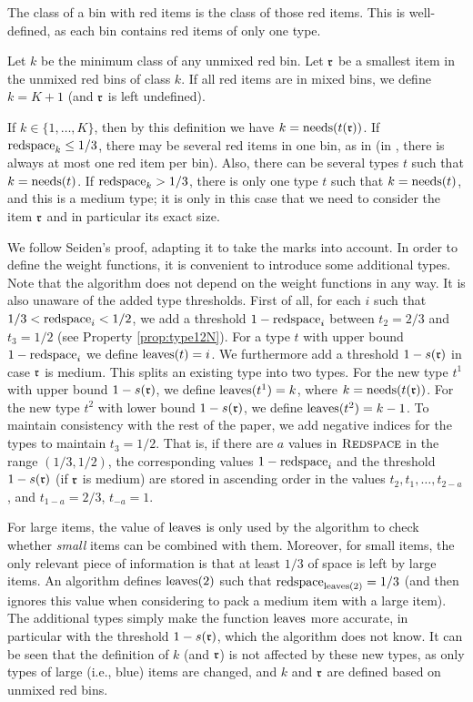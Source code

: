 The class of a bin with red items is the class of those red items.
This is well-defined, as each bin contains red items of only one type.

\begin{definition}
	\label{def:6}
	Let $k$ be the minimum class of any unmixed red bin.
Let $\mathfrak{r}$ be a smallest item in the unmixed red bins of class $k$. If all red items are in mixed bins, we define $k=K+1$ (and $\mathfrak{r}$ is left undefined).
\end{definition}

If $k\in\{1,\dots,K\}$, then by this definition we have $k=\mathrm{needs}(t(\mathfrak{r}))$. 
If $\mathrm{redspace}_k\le 1/3$, there may be several red items in one bin,
as in {\SuperH} (in {\Hpp}, there is always at most one red item per bin).
Also, there can be several types $t$ such that $k=\mathrm{needs}(t)$.
If $\mathrm{redspace}_k > 1/3$, there is only one type $t$ such that $k=\mathrm{needs}(t)$, and this is a medium type; it is only in this case that we need to consider the item $\mathfrak{r}$ and in particular its exact size.

We follow Seiden's proof, adapting it to take the marks into account.
In order to define the weight functions, it is convenient to introduce some additional types.
Note that the algorithm does not depend on the weight functions in any way.
It is also unaware of the added type thresholds.
First of all, for each $i$ such that $1/3<\mathrm{redspace}_i<1/2$,
we add a threshold $1-\mathrm{redspace}_i$ between $t_2=2/3$ and $t_3=1/2$
(see Property \ref{prop:type12N}).
For a type $t$ with upper bound $1-\mathrm{redspace}_i$ we define
$\mathrm{leaves}(t)=i$. We furthermore add a threshold $1-s(\mathfrak{r})$ in case
$\mathfrak{r}$ is medium.
This splits an existing type into two types.
For the new type $t^1$ with upper bound $1-s(\mathfrak{r})$, we define
$\mathrm{leaves}(t^1) = k$, where $k = \mathrm{needs}(t(\mathfrak{r}))$.
For the new type $t^2$ with lower bound $1-s(\mathfrak{r})$, we define
$\mathrm{leaves}(t^2) = k - 1$.
To maintain consistency with the rest of the paper, 
we add negative indices for the types to maintain $t_3=1/2$.
That is, if there are $a$ values in $\mbox{\textsc{Redspace}}$ in the range $(1/3,1/2)$,
the corresponding values $1-\mathrm{redspace}_i$ and the threshold $1-s(\mathfrak{r})$ 
(if $\mathfrak{r}$ is medium)
are stored in ascending order in the values $t_2,t_1,\dots,t_{2-a}$, and $t_{1-a}=2/3$, $t_{-a}=1$.



For large items, the value of $\mathrm{leaves}$ is only used by the algorithm to check whether \emph{small} items can be combined with them.
Moreover, for small items, the only relevant piece of information is that at least $1/3$ of space is left by large items.
An {\EHarm} algorithm defines $\mathrm{leaves}(2)$ such that $\mathrm{redspace}_{\mathrm{leaves}(2)}=1/3$ (and then ignores this value when considering to pack a medium item with a large item). The additional types simply make the function $\mathrm{leaves}$ more accurate, in particular with the threshold $1-s(\mathfrak{r})$, which the algorithm does not know.
It can be seen that the definition of $k$ (and $\mathfrak{r}$) is not affected by these new types, as only types of large (i.e., blue) items are changed, and $k$ and $\mathfrak{r}$ are defined based on unmixed red bins.

